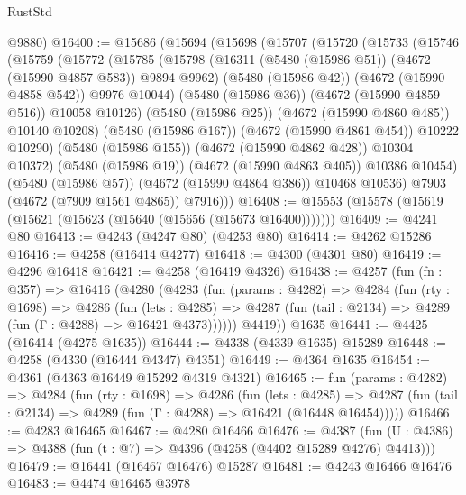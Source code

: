 \begin{lexlean}{RustStd}
\begin{coremodule}
      @9880)
@16400 := @15686
    (@15694
      (@15698
        (@15707
          (@15720
            (@15733
              (@15746
                (@15759
                  (@15772
                    (@15785
                      (@15798
                        (@16311 (@5480 (@15986 @51)) (@4672 (@15990 @4857 @583)) @9894 @9962)
                        (@5480 (@15986 @42))
                        (@4672 (@15990 @4858 @542))
                        @9976
                        @10044)
                      (@5480 (@15986 @36))
                      (@4672 (@15990 @4859 @516))
                      @10058
                      @10126)
                    (@5480 (@15986 @25))
                    (@4672 (@15990 @4860 @485))
                    @10140
                    @10208)
                  (@5480 (@15986 @167))
                  (@4672 (@15990 @4861 @454))
                  @10222
                  @10290)
                (@5480 (@15986 @155))
                (@4672 (@15990 @4862 @428))
                @10304
                @10372)
              (@5480 (@15986 @19))
              (@4672 (@15990 @4863 @405))
              @10386
              @10454)
            (@5480 (@15986 @57))
            (@4672 (@15990 @4864 @386))
            @10468
            @10536)
          @7903
          (@4672 (@7909 @1561 @4865))
          @7916)))
@16408 := @15553 (@15578 (@15619 (@15621 (@15623 (@15640 (@15656 (@15673 @16400)))))))
@16409 := @4241 @80
@16413 := @4243 (@4247 @80) (@4253 @80)
@16414 := @4262 @15286
@16416 := @4258 (@16414 @4277)
@16418 := @4300 (@4301 @80)
@16419 := @4296 @16418
@16421 := @4258 (@16419 @4326)
@16438 := @4257
    (fun (fn : @357) =>
    @16416
      (@4280
        (@4283
          (fun (params : @4282) =>
          @4284
            (fun (rty : @1698) =>
            @4286
              (fun (lets : @4285) =>
              @4287 (fun (tail : @2134) => @4289 (fun (Γ : @4288) => @16421 @4373))))))
        @4419))
    @1635
@16441 := @4425 (@16414 (@4275 @1635))
@16444 := @4338 (@4339 @1635) @15289
@16448 := @4258 (@4330 (@16444 @4347) @4351)
@16449 := @4364 @1635
@16454 := @4361 (@4363 @16449 @15292 @4319 @4321)
@16465 := fun (params : @4282) =>
  @4284
    (fun (rty : @1698) =>
    @4286
      (fun (lets : @4285) =>
      @4287 (fun (tail : @2134) => @4289 (fun (Γ : @4288) => @16421 (@16448 @16454)))))
@16466 := @4283 @16465
@16467 := @4280 @16466
@16476 := @4387
    (fun (U : @4386) => @4388 (fun (t : @7) => @4396 (@4258 (@4402 @15289 @4276) @4413)))
@16479 := @16441 (@16467 @16476) @15287
@16481 := @4243 @16466 @16476
@16483 := @4474 @16465 @3978

\end{coremodule}
\end{lexlean}
